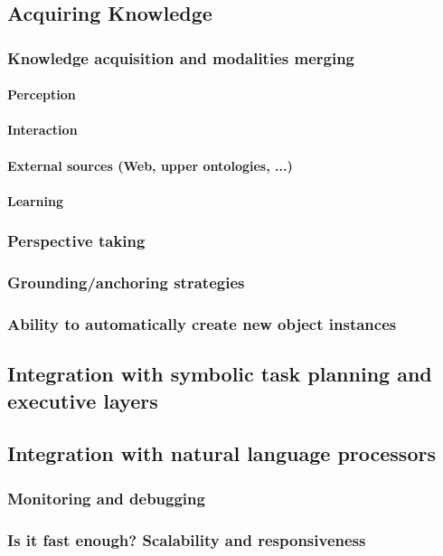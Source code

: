 \subsection{Acquiring Knowledge}

\subsubsection{Knowledge acquisition and modalities merging}

\paragraph{Perception}
\paragraph{Interaction}
\paragraph{External sources (Web, upper ontologies, ...)}
\paragraph{Learning}

\subsubsection{Perspective taking}
\label{sect|perspectivetaking}

\subsubsection{Grounding/anchoring strategies}

\subsubsection{Ability to automatically create new object instances}


\subsection{Integration with symbolic task planning and executive layers}


\subsection{Integration with natural language processors}


\subsubsection{Monitoring and debugging}

\subsubsection{Is it fast enough? Scalability and responsiveness}


